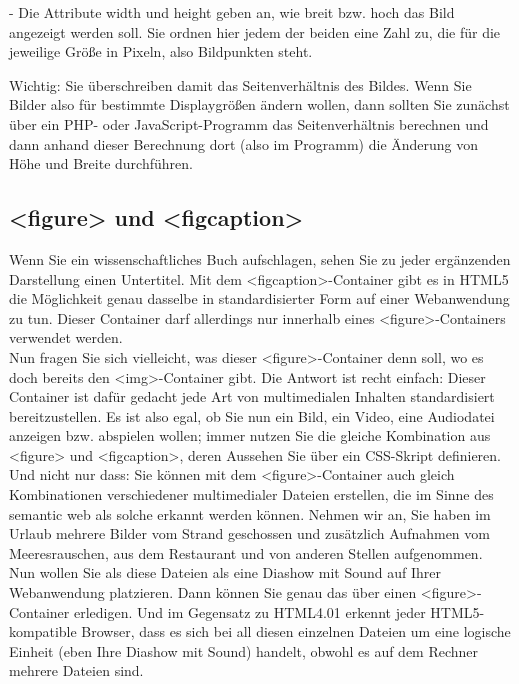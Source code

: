 -	Die Attribute width und height geben an, wie breit bzw. hoch das Bild angezeigt werden soll. Sie ordnen hier jedem der beiden eine Zahl zu, die für die jeweilige Größe in Pixeln, also Bildpunkten steht. 

Wichtig: Sie überschreiben damit das Seitenverhältnis des Bildes. Wenn Sie Bilder also für bestimmte Displaygrößen ändern wollen, dann sollten Sie zunächst über ein PHP- oder JavaScript-Programm das Seitenverhältnis berechnen und dann anhand dieser Berechnung dort (also im Programm) die Änderung von Höhe und Breite durchführen.

\subsection{<figure> und <figcaption>}

Wenn Sie ein wissenschaftliches Buch aufschlagen, sehen Sie zu jeder ergänzenden Darstellung einen Untertitel. Mit dem <figcaption>-Container gibt es in HTML5 die Möglichkeit genau dasselbe in standardisierter Form auf einer Webanwendung zu tun. Dieser Container darf allerdings nur innerhalb eines <figure>-Containers verwendet werden.\\

Nun fragen Sie sich vielleicht, was dieser <figure>-Container denn soll, wo es doch bereits den <img>-Container gibt. Die Antwort ist recht einfach: Dieser Container ist dafür gedacht jede Art von multimedialen Inhalten standardisiert bereitzustellen. Es ist also egal, ob Sie nun ein Bild, ein Video, eine Audiodatei anzeigen bzw. abspielen wollen; immer nutzen Sie die gleiche Kombination aus <figure> und <figcaption>, deren Aussehen Sie über ein CSS-Skript definieren.\\

Und nicht nur dass: Sie können mit dem <figure>-Container auch gleich Kombinationen verschiedener multimedialer Dateien erstellen, die im Sinne des semantic web als solche erkannt werden können. Nehmen wir an, Sie haben im Urlaub mehrere Bilder vom Strand geschossen und zusätzlich Aufnahmen vom Meeresrauschen, aus dem Restaurant und von anderen Stellen aufgenommen. Nun wollen Sie als diese Dateien als eine Diashow mit Sound auf Ihrer Webanwendung platzieren. Dann können Sie genau das über einen <figure>-Container erledigen. Und im Gegensatz zu HTML4.01 erkennt jeder HTML5-kompatible Browser, dass es sich bei all diesen einzelnen Dateien um eine logische Einheit (eben Ihre Diashow mit Sound) handelt, obwohl es auf dem Rechner mehrere Dateien sind.\\

